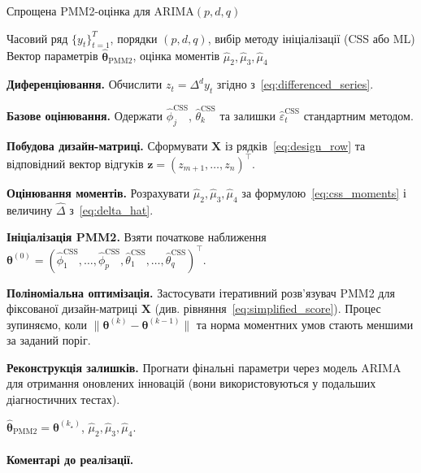 \documentclass[12pt,a4paper]{article}
\begin{document}
\begin{algorithm}[H]
\caption{Спрощена PMM2-оцінка для ARIMA$(p,d,q)$}
\label{alg:pmm2_arima}
\begin{algorithmic}[1]
\REQUIRE Часовий ряд $\{y_t\}_{t=1}^T$, порядки $(p,d,q)$, вибір методу ініціалізації (CSS або ML)
\ENSURE Вектор параметрів $\hat{\boldsymbol{\theta}}_{\text{PMM2}}$, оцінка моментів $\hat{\mu}_2,\hat{\mu}_3,\hat{\mu}_4$

\STATE \textbf{Диференціювання.} Обчислити $z_t = \Delta^d y_t$ згідно з~\eqref{eq:differenced_series}.

\STATE \textbf{Базове оцінювання.} Одержати $\hat{\phi}_j^{\text{CSS}}$, $\hat{\theta}_k^{\text{CSS}}$ та залишки $\widehat{\varepsilon}_t^{\text{CSS}}$ стандартним методом.

\STATE \textbf{Побудова дизайн-матриці.} Сформувати $\mathbf{X}$ із рядків~\eqref{eq:design_row} та відповідний вектор відгуків $\mathbf{z} = (z_{m+1},\ldots,z_n)^\top$.

\STATE \textbf{Оцінювання моментів.} Розрахувати $\hat{\mu}_2,\hat{\mu}_3,\hat{\mu}_4$ за формулою~\eqref{eq:css_moments} і величину $\hat{\Delta}$ з~\eqref{eq:delta_hat}.

\STATE \textbf{Ініціалізація PMM2.} Взяти початкове наближення $\boldsymbol{\theta}^{(0)} = (\hat{\phi}_1^{\text{CSS}},\ldots,\hat{\phi}_p^{\text{CSS}},\hat{\theta}_1^{\text{CSS}},\ldots,\hat{\theta}_q^{\text{CSS}})^\top$.

\STATE \textbf{Поліноміальна оптимізація.} Застосувати ітеративний розв'язувач PMM2 для фіксованої дизайн-матриці $\mathbf{X}$ (див. рівняння~\eqref{eq:simplified_score}). Процес зупиняємо, коли $\|\boldsymbol{\theta}^{(k)} - \boldsymbol{\theta}^{(k-1)}\|$ та норма моментних умов стають меншими за заданий поріг.

\STATE \textbf{Реконструкція залишків.} Прогнати фінальні параметри через модель ARIMA для отримання оновлених інновацій (вони використовуються у подальших діагностичних тестах).

\RETURN $\hat{\boldsymbol{\theta}}_{\text{PMM2}} = \boldsymbol{\theta}^{(k_\star)}$, $\hat{\mu}_2,\hat{\mu}_3,\hat{\mu}_4$.
\end{algorithmic}
\end{algorithm}

\paragraph{Коментарі до реалізації.}
\end{document}
